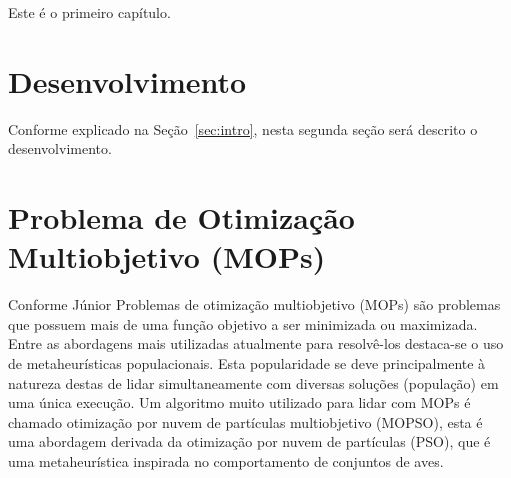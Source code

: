 Este \'e o primeiro cap\'itulo. 
 


\section{Desenvolvimento}\label{sec:desenv}

Conforme explicado na Se\c{c}\~ao~\ref{sec:intro}, nesta segunda se\c{c}\~ao ser\'a descrito o desenvolvimento.


\section{Problema de Otimização Multiobjetivo (MOPs)}\label{sec:mops}

Conforme Júnior \cite{olacir2013} Problemas de otimização multiobjetivo (MOPs) são problemas que possuem mais de uma função objetivo a ser minimizada ou maximizada. Entre as abordagens mais utilizadas atualmente para resolvê-los destaca-se o uso de metaheurísticas populacionais. Esta popularidade se deve principalmente à natureza destas de lidar simultaneamente com diversas soluções (população) em uma única execução.
Um algoritmo muito utilizado para lidar com MOPs é chamado otimização por nuvem de partículas multiobjetivo (MOPSO), esta é uma abordagem derivada da otimização por nuvem de partículas (PSO), que é uma metaheurística inspirada no comportamento de conjuntos de aves.
